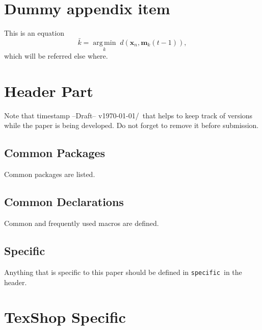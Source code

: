 \documentclass[10pt,journal,compsoc]{IEEEtran}
\newcommand{\hbTimeStamp}{{\color{red}--Draft-- v\today/\currenttime}} %
\newcommand{\hCode}[1]{\texttt{{\footnotesize #1}}}
\newcommand{\hArgmin}[2]{\underset{#1}{\operatorname{arg \, min}}\;#2}
\theoremstyle{plain}
\theoremstyle{definition}
\theoremstyle{remark}
\newcommand{\hbSSpecific}{\hCode{specific}}
\begin{document}
{%
\section{Dummy appendix item}
	\label{sec:dummyAppendix}


This is an equation
\begin{equation}
	\label{eq:equationInAppendix}
	\bar{k} = \hArgmin{k} d(\mathbf{x}_{n},  \mathbf{m}_{k}(t-1)),
\end{equation}
which will be referred else where.




\section{Header Part}

Note that timestamp \hbTimeStamp\ that helps to keep track of versions 
while the paper is being developed.
Do not forget to remove it before submission.





\subsection{Common Packages}

Common packages are listed.




\subsection{Common Declarations}

Common and frequently used macros are defined.




\subsection{Specific}

Anything that is specific to this paper should be defined in \hbSSpecific\ in the header.




\section{TexShop Specific}

}
\end{document}
